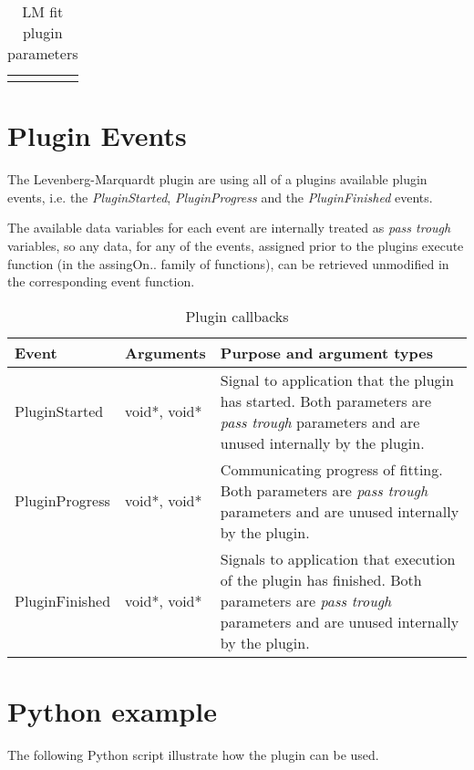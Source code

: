 \begin{landscape}
\begin{longtable}{p{4cm} l p{3cm}  p{10cm}}
\hline %
\caption{LM fit plugin parameters} 
\label{table:lmfitPluginParameters} 
\end{longtable}

\end{landscape}

\section{Plugin Events}
The Levenberg-Marquardt plugin are using all of a plugins available plugin events, i.e. the \emph{PluginStarted}, \emph{PluginProgress} and the \emph{PluginFinished} events.

The available data variables for each event are internally treated as \emph{pass trough} variables, so any data, for any of the events, assigned prior to 
the plugins execute function (in the assingOn.. family of functions), can be retrieved unmodified in the corresponding event function.

\begin{table}[ht]
\centering %
\begin{tabular}{l l p{9cm}} 

Event & Arguments & Purpose and argument types \\ [0.5ex] %
\hline %
PluginStarted  	& 	void*, void*  & Signal to application that the plugin has started. Both parameters are \emph{pass trough} parameters and are unused internally by the plugin.\\[0.5ex]
PluginProgress	& 	void*, void*  & Communicating progress of fitting. Both parameters are \emph{pass trough} parameters and are unused internally by the plugin. \\[0.5ex]
PluginFinished	& 	void*, void*  & Signals to application that execution of the plugin has finished. Both parameters are \emph{pass trough} parameters and are unused internally by the plugin.\\

\hline %
\end{tabular}
\caption{Plugin callbacks} 
\label{table:lmfitPluginCallBacks} 
\end{table}

\section{Python example}
The following Python script illustrate how the plugin can be used. 


